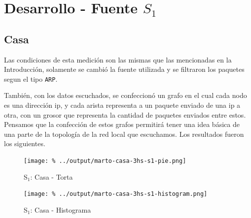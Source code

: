 \documentclass[final,inline,a4paper,narroweqnarray]{ieee}
\begin{document}



\section{Desarrollo - Fuente $S_1$}
  \subsection{Casa}

  Las condiciones de esta medición son las mismas que las mencionadas
  en la Introducción, solamente se cambió la fuente utilizada y se
  filtraron los paquetes segun el tipo \texttt{ARP}.
  
  También, con los datos escuchados, se confeccionó un grafo en el
  cual cada nodo es una dirección ip, y cada arista representa a un
  paquete enviado de una ip a otra, con un grosor que representa la
  cantidad de paquetes enviados entre estos. Pensamos que la
  confección de estos grafos permitirá tener una idea básica de una
  parte de la topología de la red local que escuchamos. Los resultados
  fueron los siguientes.

    \begin{figure}[ht]\begin{center}
      \texttt{[image: \%
      ../output/marto-casa-3hs-s1-pie.png]}
      \vspace{-2em}
      \caption{S$_1$: Casa - Torta}
      \label{marto-casa-3hs-s1-pie}
    \end{center}\end{figure}

    \begin{figure}[ht]\begin{center}
      \texttt{[image: \%
      ../output/marto-casa-3hs-s1-histogram.png]}
      \vspace{-2em}
      \caption{S$_1$: Casa - Histograma}
      \label{marto-casa-3hs-s1-histogram}
    \end{center}\end{figure}	
\end{document}
